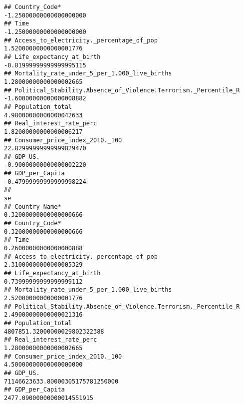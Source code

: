 \documentclass[
]{article}
\newenvironment{Shaded}{\begin{snugshade}}{\end{snugshade}}
\newcommand{\FunctionTok}[1]{\textcolor[rgb]{0.13,0.29,0.53}{\textbf{#1}}}
\newcommand{\NormalTok}[1]{#1}
\newcommand{\SpecialCharTok}[1]{\textcolor[rgb]{0.81,0.36,0.00}{\textbf{#1}}}
\begin{document}
\begin{verbatim}
## Country_Code*                                                   -1.25000000000000000000
## Time                                                            -1.25000000000000000000
## Access_to_electricity._percentage_of_pop                         1.52000000000000001776
## Life_expectancy_at_birth                                        -0.81999999999999995115
## Mortality_rate_under_5_per_1.000_live_births                     1.28000000000000002665
## Political_Stability.Absence_of_Violence.Terrorism._Percentile_R -1.60000000000000008882
## Population_total                                                 4.98000000000000042633
## Real_interest_rate_perc                                          1.82000000000000006217
## Consumer_price_index_2010._100                                  22.82999999999999829470
## GDP_US.                                                         -0.90000000000000002220
## GDP_per_Capita                                                  -0.47999999999999998224
##                                                                                               se
## Country_Name*                                                             0.32000000000000000666
## Country_Code*                                                             0.32000000000000000666
## Time                                                                      0.26000000000000000888
## Access_to_electricity._percentage_of_pop                                  2.31000000000000005329
## Life_expectancy_at_birth                                                  0.73999999999999999112
## Mortality_rate_under_5_per_1.000_live_births                              2.52000000000000001776
## Political_Stability.Absence_of_Violence.Terrorism._Percentile_R           2.49000000000000021316
## Population_total                                                    4807851.32000000029802322388
## Real_interest_rate_perc                                                   1.28000000000000002665
## Consumer_price_index_2010._100                                            4.50000000000000000000
## GDP_US.                                                         71146623633.80000305175781250000
## GDP_per_Capita                                                         2477.09000000000014551915
\end{verbatim}

\begin{Shaded}
\end{Shaded}
\end{document}
